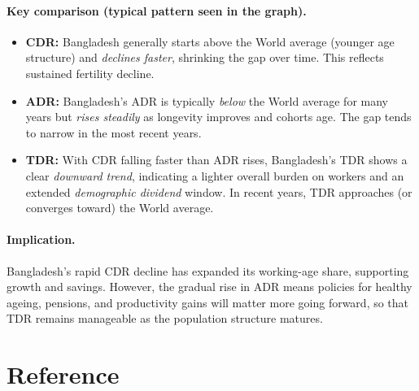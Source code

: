 \paragraph{Key comparison (typical pattern seen in the graph).}
\begin{itemize}
  \item \textbf{CDR:} Bangladesh generally starts above the World average (younger age structure) and \emph{declines faster}, shrinking the gap over time. This reflects sustained fertility decline.
  \item \textbf{ADR:} Bangladesh’s ADR is typically \emph{below} the World average for many years but \emph{rises steadily} as longevity improves and cohorts age. The gap tends to narrow in the most recent years.
  \item \textbf{TDR:} With CDR falling faster than ADR rises, Bangladesh’s TDR shows a clear \emph{downward trend}, indicating a lighter overall burden on workers and an extended \emph{demographic dividend} window. In recent years, TDR approaches (or converges toward) the World average.
\end{itemize}

\paragraph{Implication.}
Bangladesh’s rapid CDR decline has expanded its working-age share, supporting growth and savings. However, the gradual rise in ADR means policies for healthy ageing, pensions, and productivity gains will matter more going forward, so that TDR remains manageable as the population structure matures.
\section{Reference}





